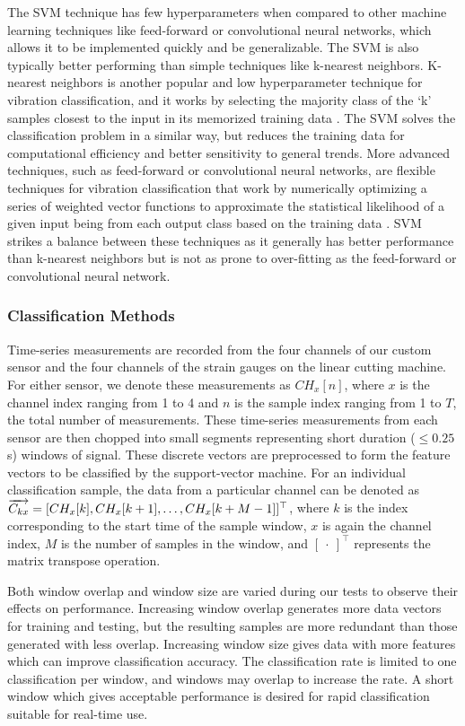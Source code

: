 The SVM technique has few hyperparameters when compared to other 
 machine learning techniques like feed-forward or convolutional neural networks, 
 which allows it to be implemented quickly and be generalizable. 
The SVM is also typically better performing than simple techniques like k-nearest neighbors.
K-nearest neighbors is another popular and low hyperparameter technique
 for vibration classification, and it works by selecting the majority class
 of the `k' samples closest to the input in its memorized training data \cite{hu21}.
The SVM solves the classification problem in a similar way, but reduces the training data
 for computational efficiency and better sensitivity to general trends.
More advanced techniques, such as feed-forward or convolutional neural networks,
 are flexible techniques for vibration classification that work by numerically optimizing
 a series of weighted vector functions to approximate the statistical likelihood
 of a given input being from each output class based on the training data \cite{chen16}.
SVM strikes a balance between these techniques as it generally has better performance than k-nearest neighbors 
 but is not as prone to over-fitting as the feed-forward or convolutional neural network.

\subsubsection{Classification Methods}

Time-series measurements are recorded from the four channels of our custom sensor
 and the four channels of the strain gauges on the linear cutting machine.
For either sensor, we denote these measurements as $CH_x[n]$, where $x$ is the channel index 
 ranging from 1 to 4 and $n$ is the sample index ranging from 1 to $T$, the total number of measurements. 
These time-series measurements from each sensor are then chopped into small segments representing 
 short duration ($\leq 0.25$ s) windows of signal. 
These discrete vectors are preprocessed to form the feature 
 vectors to be classified by the support-vector machine. 
For an individual classification sample, the data from a particular
 channel can be denoted as $\overrightarrow{C_{kx}} = [CH_x[k], CH_x[k+1], \ldots, CH_x[k+M-1]]^\top$, where
 $k$ is the index corresponding to the start time of the sample window, $x$ is again the channel index,
 $M$ is the number of samples in the window, 
and $[\> \cdot \>]^\top$ represents the matrix transpose operation.

Both window overlap and window size are varied during our tests to observe their effects on performance. 
Increasing window overlap generates more data vectors for training and testing,
 but the resulting samples are more redundant than those generated with less overlap.
Increasing window size gives data with more features which can improve classification accuracy.
The classification rate is limited to one classification per window, 
 and windows may overlap to increase the rate.
A short window which gives acceptable performance is desired 
 for rapid classification suitable for real-time use. 

